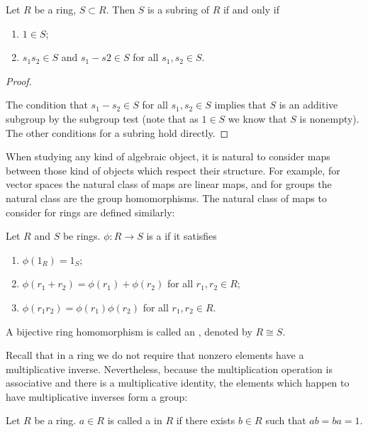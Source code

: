 \begin{lemma}
Let $R$ be a ring, $S\subset R$. Then $S$ is a subring of $R$ if and only if
\begin{enumerate}[label=(\roman*)]
\item $1\in S$;
\item $s_1s_2\in S$ and $s_1-s2\in S$ for all $s_1,s_2\in S$.
\end{enumerate}
\end{lemma}

\begin{proof} \

\fbox{$\implies$}

\fbox{$\impliedby$} The condition that $s_1-s_2\in S$ for all $s_1,s_2\in S$ implies that $S$ is an additive subgroup by the subgroup test (note that as $1\in S$ we know that $S$ is nonempty). The other conditions for a subring hold directly.
\end{proof}

When studying any kind of algebraic object, it is natural to consider maps between those kind of objects which respect their structure. For example, for vector spaces the natural class of maps are linear maps, and for groups the natural class are the group homomorphisms. The natural class of maps to consider for rings are defined similarly:

\begin{definition}
Let $R$ and $S$ be rings. $\phi:R\to S$ is a  if it satisfies
\begin{enumerate}[label=(\roman*)]
\item $\phi(1_R)=1_S$;
\item $\phi(r_1+r_2)=\phi(r_1)+\phi(r_2)$ for all $r_1,r_2\in R$;
\item $\phi(r_1r_2)=\phi(r_1)\phi(r_2)$ for all $r_1,r_2\in R$.
\end{enumerate}
A bijective ring homomorphism is called an , denoted by $R\cong S$.
\end{definition}

Recall that in a ring we do not require that nonzero elements have a multiplicative inverse. Nevertheless, because the multiplication operation is associative and there is a multiplicative identity, the elements which happen to have multiplicative inverses form a group:

\begin{definition}[Unit]
Let $R$ be a ring. $a\in R$ is called a  in $R$ if there exists $b\in R$ such that $ab=ba=1$.
\end{definition}

